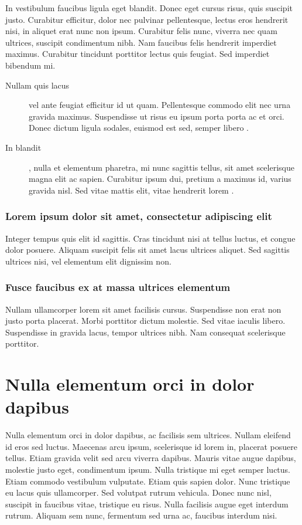 In vestibulum faucibus ligula eget blandit. Donec eget cursus risus, quis suscipit justo. Curabitur efficitur, dolor nec pulvinar pellentesque, lectus eros hendrerit nisi, in aliquet erat nunc non ipsum. Curabitur felis nunc, viverra nec quam ultrices, suscipit condimentum nibh. Nam faucibus felis hendrerit imperdiet maximus. Curabitur tincidunt porttitor lectus quis feugiat. Sed imperdiet bibendum mi.

\begin{description}
    \item[Nullam quis lacus] vel ante feugiat efficitur id ut quam. Pellentesque commodo elit nec urna gravida maximus. Suspendisse ut risus eu ipsum porta porta ac et orci. Donec dictum ligula sodales, euismod est sed, semper libero . 
    \item[In blandit], nulla et elementum pharetra, mi nunc sagittis tellus, sit amet scelerisque magna elit ac sapien. Curabitur ipsum dui, pretium a maximus id, varius gravida nisl. Sed vitae mattis elit, vitae hendrerit lorem \cite{IEEE315}.
\end{description}

\subsubsection{Lorem ipsum dolor sit amet, consectetur adipiscing elit}

Integer tempus quis elit id sagittis. Cras tincidunt nisi at tellus luctus, et congue dolor posuere. Aliquam suscipit felis sit amet lacus ultrices aliquet. Sed sagittis ultrices nisi, vel elementum elit dignissim non. 

\subsubsection{Fusce faucibus ex at massa ultrices elementum}

Nullam ullamcorper lorem sit amet facilisis cursus. Suspendisse non erat non justo porta placerat. Morbi porttitor dictum molestie. Sed vitae iaculis libero. Suspendisse in gravida lacus, tempor ultrices nibh. Nam consequat scelerisque porttitor.

\section{Nulla elementum orci in dolor dapibus}

Nulla elementum orci in dolor dapibus, ac facilisis sem ultrices. Nullam eleifend id eros sed luctus. Maecenas arcu ipsum, scelerisque id lorem in, placerat posuere tellus. Etiam gravida velit sed arcu viverra dapibus. Mauris vitae augue dapibus, molestie justo eget, condimentum ipsum. Nulla tristique mi eget semper luctus. Etiam commodo vestibulum vulputate. Etiam quis sapien dolor. Nunc tristique eu lacus quis ullamcorper. Sed volutpat rutrum vehicula. Donec nunc nisl, suscipit in faucibus vitae, tristique eu risus. Nulla facilisis augue eget interdum rutrum. Aliquam sem nunc, fermentum sed urna ac, faucibus interdum nisi.

